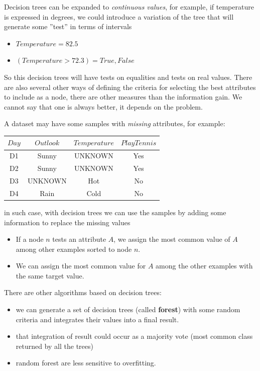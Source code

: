 \documentclass[10pt, letterpaper]{report}
\begin{document}
Decision trees can be expanded to \textit{continuous values}, for example, if temperature is expressed in degrees, we could introduce a variation of the tree that will generate some ''test'' in terms of intervals\begin{itemize}
	\item $Temperature=82.5$
	\item $(Temperature > 72.3) = True,False$
\end{itemize}
So this decision trees will have tests on equalities and tests on real values. There are also several other ways of defining the criteria for selecting the best attributes to include as a node, there are other measures than the information gain. We cannot say that one is always better, it depends on the problem.\bigskip

A dataset may have some samples with \textit{missing} attributes, for example:\begin{center}
	\begin{tabular}{|c|c|c|c|}
		\hline
		{$Day$} & {$Outlook$} & {$Temperature$} & {$PlayTennis$} \\
		\hline
		D1      & Sunny       & UNKNOWN         & Yes            \\
		\hline
		D2      & Sunny       & UNKNOWN         & Yes            \\
		\hline
		D3      & UNKNOWN     & Hot             & No             \\
		\hline
		D4      & Rain        & Cold            & No             \\
		\hline
	\end{tabular}
\end{center}
in such case, with decision trees we can use the samples by adding some information to replace the missing values\begin{itemize}
	\item If a node $n$ tests an attribute $A$, we assign the most common value of $A$ among other examples sorted to node $n$.
	\item We can assign the most common value for $A$ among the other examples with the same target value.
\end{itemize}
There are other algorithms based on decision trees:\begin{itemize}
	\item we can generate a set of decision trees (called \textbf{forest}) with some random criteria and integrates their values into a final result.
	\item that integration of result could occur as a majority vote (most common class returned by all the trees)
	\item random forest are less sensitive to overfitting.
\end{itemize}
\end{document}
